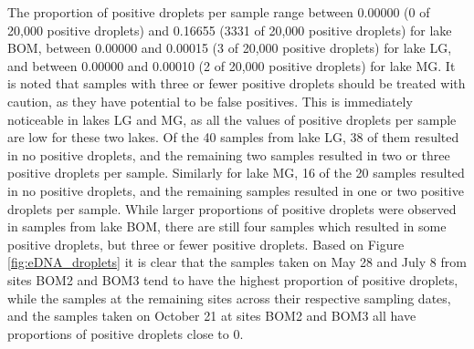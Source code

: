 \documentclass[12pt]{article}\usepackage[]{graphicx}\usepackage[]{color}
\newenvironment{knitrout}{}{} %
\newenvironment{knitrout}{}{} %
\begin{document}
\begin{knitrout}
\color{fgcolor}\begin{table}[!h]

\caption{\label{tab:eDNA_table}\label{tab:eDNA_data}10 sample rows of the eDNA data.}
\centering
{}
\end{table}


\end{knitrout}



The proportion of positive droplets per sample range between 0.00000 (0 of 20,000 positive droplets) and 0.16655 (3331 of 20,000 positive droplets) for lake BOM, between 0.00000 and 0.00015 (3 of 20,000 positive droplets) for lake LG, and between 0.00000 and 0.00010 (2 of 20,000 positive droplets) for lake MG. It is noted that samples with three or fewer positive droplets should be treated with caution, as they have potential to be false positives. This is immediately noticeable in lakes LG and MG, as all the values of positive droplets per sample are low for these two lakes. Of the 40 samples from lake LG, 38 of them resulted in no positive droplets, and the remaining two samples resulted in two or three positive droplets per sample. Similarly for lake MG, 16 of the 20 samples resulted in no positive droplets, and the remaining samples resulted in one or two positive droplets per sample. While larger proportions of positive droplets were observed in samples from lake BOM, there are still four samples which resulted in some positive droplets, but three or fewer positive droplets. Based on Figure \ref{fig:eDNA_droplets} it is clear that the samples taken on May 28 and July 8 from sites BOM2 and BOM3 tend to have the highest proportion of positive droplets, while the samples at the remaining sites across their respective sampling dates, and the samples taken on October 21 at sites BOM2 and BOM3 all have proportions of positive droplets close to 0. 
\end{document}
